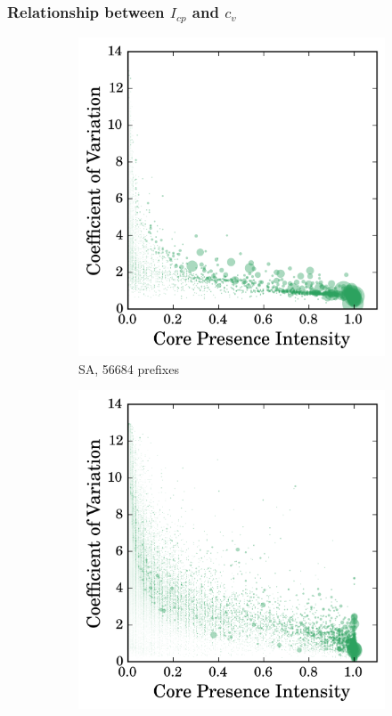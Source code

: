 \subsubsection{Relationship between $I_{cp}$ and $c_v$}
\begin{figure}
		\centering
        \begin{subfigure}[b]{0.49\textwidth}
                \includegraphics[width=\textwidth]{gfx/chap2/corre_cv_cp_sa.png}
                \caption{SA, 56684 prefixes}
                \label{fig:cv_cp_sa}
        \end{subfigure}
        \begin{subfigure}[b]{0.49\textwidth}
                \includegraphics[width=\textwidth]{gfx/chap2/corre_cv_cp_sb.png}

\end{subfigure}
\end{figure}
